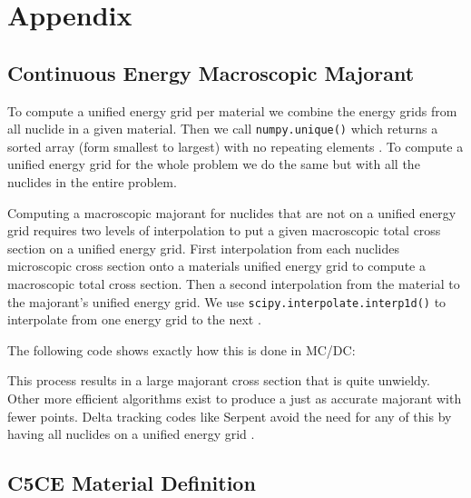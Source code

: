 \section*{Appendix}


\subsection*{Continuous Energy Macroscopic Majorant}
\label{app:majorant}

To compute a unified energy grid per material we combine the energy grids from all nuclide in a given material. 
Then we call \texttt{numpy.unique()} which returns a sorted array (form smallest to largest) with no repeating elements \cite{van_der_walt_numpy_2011}.
To compute a unified energy grid for the whole problem we do the same but with all the nuclides in the entire problem.

Computing a macroscopic majorant for nuclides that are not on a unified energy grid requires two levels of interpolation to put a given macroscopic total cross section on a unified energy grid.
First interpolation from each nuclides microscopic cross section onto a materials unified energy grid to compute a macroscopic total cross section.
Then a second interpolation from the material to the majorant's unified energy grid.
We use \texttt{scipy.interpolate.interp1d()} to interpolate from one energy grid to the next \cite{2020SciPy-NMeth:a}. 

The following code shows exactly how this is done in MC/DC:



This process results in a large majorant cross section that is quite unwieldy.
Other more efficient algorithms exist to produce a just as accurate majorant with fewer points.
Delta tracking codes like Serpent avoid the need for any of this by having all nuclides on a unified energy grid \cite{leppanen_2015_serpent}.

\newpage

\subsection*{C5CE Material Definition}
\label{app:c5ce_mat}
